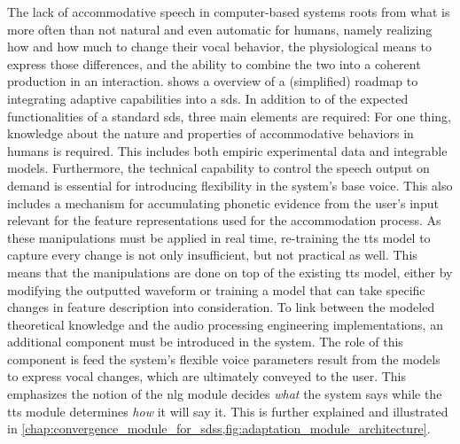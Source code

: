 The lack of accommodative speech in computer-based systems roots from what is more often than not natural and even automatic for humans, namely realizing how and how much to change their vocal behavior, the physiological means to express those differences, and the ability to combine the two into a coherent production in an interaction.
 shows a overview of a (simplified) roadmap to integrating adaptive capabilities into a \ac{sds}.
In addition to of the expected functionalities of a standard \ac{sds}, three main elements are required:
For one thing, knowledge about the nature and properties of accommodative behaviors in humans is required.
This includes both empiric experimental data and integrable models.
Furthermore, the technical capability to control the speech output on demand is essential for introducing flexibility in the system's base voice.
This also includes a mechanism for accumulating phonetic evidence from the user's input relevant for the feature representations used for the accommodation process.
As these manipulations must be applied in real time, re-training the \ac{tts} model to capture every change is not only insufficient, but not practical as well.
This means that the manipulations are done on top of the existing \ac{tts} model, either by modifying the outputted waveform or training a model that can take specific changes in feature description into consideration.
To link between the modeled theoretical knowledge and the audio processing engineering implementations, an additional component must be introduced in the system.
The role of this component is feed the system's flexible voice parameters result from the models to express vocal changes, which are ultimately conveyed to the user.
This emphasizes the notion of the \ac{nlg} module decides \emph{what} the system says while the \ac{tts} module determines \emph{how} it will say it.
This is further explained and illustrated in \cref{chap:convergence_module_for_sdss,fig:adaptation_module_architecture}.

